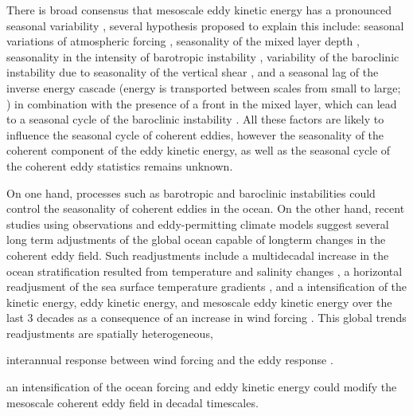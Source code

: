 \documentclass[draft,linenumbers]{agujournal2019}
\begin{document}
There is broad consensus that mesoscale eddy kinetic energy has a pronounced seasonal variability \citep{Uchida_Seasonality_2017,Kang_On_2017,Qiu_seasonal_2004, Qiu_seasonal_1999}, several hypothesis proposed to explain this include: seasonal variations of atmospheric forcing \citep{Sasaki_seasonal_2014}, seasonality of the mixed layer depth \citep{Qiu_seasonal_2014,Callies_season_2015}, seasonality in the intensity of barotropic instability \citep{Qiu_seasonal_2004}, variability of the baroclinic instability due to seasonality of the vertical shear \citep{Qiu_seasonal_1999}, and a seasonal lag of the inverse energy cascade (energy is transported between scales from small to large; \citealp{Arbic_cascade_2013}) in combination with the presence of a front in the mixed layer, which can lead to a seasonal cycle of the baroclinic instability \citep{Qiu_seasonal_2014}. All  these factors are likely to influence the seasonal cycle of coherent eddies, however the seasonality of the coherent component of the eddy kinetic energy, as well as the seasonal cycle of the coherent eddy statistics remains unknown.


On one hand, processes such as barotropic and baroclinic instabilities could control the seasonality of coherent eddies in the ocean. On the other hand, recent studies using observations and eddy-permitting climate models suggest several long term adjustments of the global ocean capable of longterm changes in the coherent eddy field. Such readjustments include a multidecadal increase in the ocean stratification resulted from temperature and salinity changes \citep{Li_stratification_2020}, a horizontal readjusment of the sea surface temperature gradients \citep{Ruela_SST_trends_2020,Bouali_SST_grad_trends_2017,Cane_SST_trends_1997}, and a intensification of the kinetic energy, eddy kinetic energy, and mesoscale eddy kinetic energy over the last 3 decades as a consequence of an increase in wind forcing \citep{Hu_acceleration_2020,Wunsch_speeding_2020,Martinez_Kinetic_2021}. This global trends readjustments are spatially heterogeneous, 


interannual response between wind forcing and the eddy response \citep{}.

an intensification of the ocean forcing and eddy kinetic energy \citep{Martinez_Kinetic_2021, Hogg_Recent_2015,Hughes_Wind_2008} could modify the mesoscale coherent eddy field in decadal timescales. 
\end{document}
